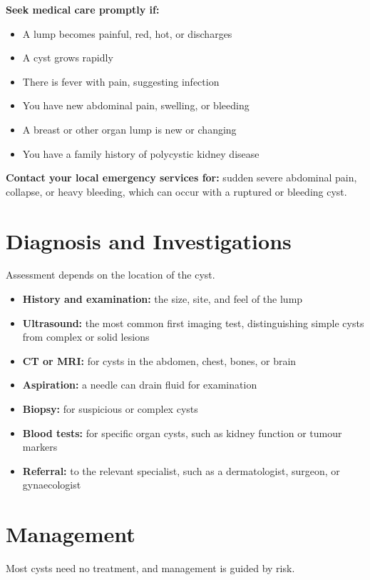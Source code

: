 \textbf{Seek medical care promptly if:}
\begin{itemize}
    \item A lump becomes painful, red, hot, or discharges
    \item A cyst grows rapidly
    \item There is fever with pain, suggesting infection
    \item You have new abdominal pain, swelling, or bleeding
    \item A breast or other organ lump is new or changing
    \item You have a family history of polycystic kidney disease
\end{itemize}

\textbf{Contact your local emergency services for:} sudden severe abdominal pain, collapse, or heavy bleeding, which can occur with a ruptured or bleeding cyst.

\section*{Diagnosis and Investigations}
Assessment depends on the location of the cyst.

\begin{itemize}
    \item \textbf{History and examination:} the size, site, and feel of the lump
    \item \textbf{Ultrasound:} the most common first imaging test, distinguishing simple cysts from complex or solid lesions
    \item \textbf{CT or MRI:} for cysts in the abdomen, chest, bones, or brain
    \item \textbf{Aspiration:} a needle can drain fluid for examination
    \item \textbf{Biopsy:} for suspicious or complex cysts
    \item \textbf{Blood tests:} for specific organ cysts, such as kidney function or tumour markers
    \item \textbf{Referral:} to the relevant specialist, such as a dermatologist, surgeon, or gynaecologist
\end{itemize}

\section*{Management}
Most cysts need no treatment, and management is guided by risk.

